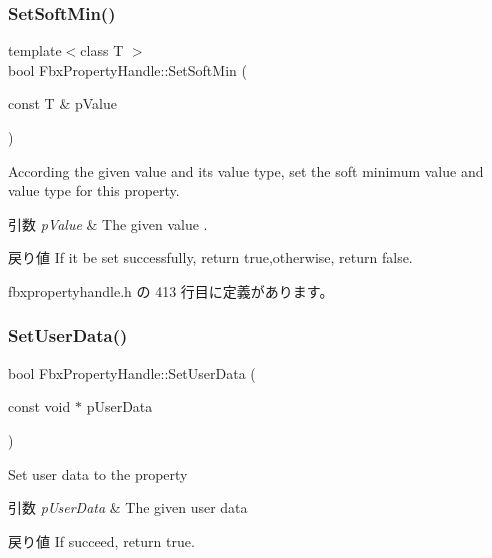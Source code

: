 \subsubsection{\texorpdfstring{Set\+Soft\+Min()}{SetSoftMin()}\hspace{0.1cm}{\footnotesize\ttfamily [2/2]}}
{\footnotesize\ttfamily template$<$class T $>$ \\
bool Fbx\+Property\+Handle\+::\+Set\+Soft\+Min (\begin{DoxyParamCaption}\item[{const T \&}]{p\+Value }\end{DoxyParamCaption})\hspace{0.3cm}{\ttfamily [inline]}}

According the given value and its value type, set the soft minimum value and value type for this property. 
\begin{DoxyParams}{引数}
{\em p\+Value} & The given value . \\
\hline
\end{DoxyParams}
\begin{DoxyReturn}{戻り値}
If it be set successfully, return true,otherwise, return false. 
\end{DoxyReturn}


 fbxpropertyhandle.\+h の 413 行目に定義があります。

\mbox{\label{class_fbx_property_handle_ac8ae1291fa5e34f1eb1373a42e8245c8}} 
\subsubsection{\texorpdfstring{Set\+User\+Data()}{SetUserData()}}
{\footnotesize\ttfamily bool Fbx\+Property\+Handle\+::\+Set\+User\+Data (\begin{DoxyParamCaption}\item[{const void $\ast$}]{p\+User\+Data }\end{DoxyParamCaption})}

Set user data to the property 
\begin{DoxyParams}{引数}
{\em p\+User\+Data} & The given user data \\
\hline
\end{DoxyParams}
\begin{DoxyReturn}{戻り値}
If succeed, return true. 
\end{DoxyReturn}
\mbox{\label{class_fbx_property_handle_a41eff619689a61cf283d9913429a6221}} 
